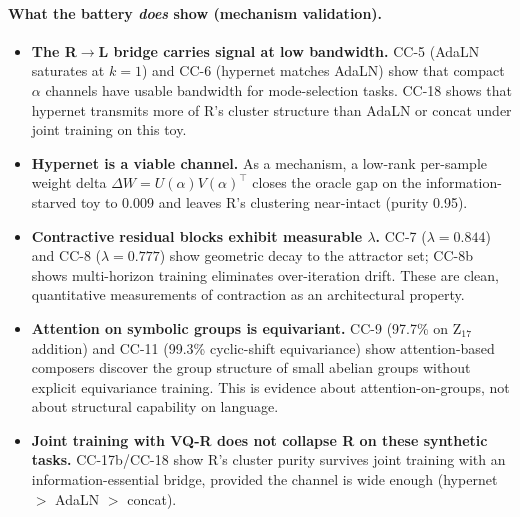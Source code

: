 \documentclass[10pt, twocolumn, a4paper]{article}
\begin{document}
\paragraph{What the battery \emph{does} show (mechanism validation).}
\begin{itemize}[nosep,leftmargin=*]
\item \textbf{The R$\to$L bridge carries signal at low bandwidth.} CC-5 (AdaLN saturates at $k{=}1$) and CC-6 (hypernet matches AdaLN) show that compact $\alpha$ channels have usable bandwidth for mode-selection tasks. CC-18 shows that hypernet transmits more of R's cluster structure than AdaLN or concat under joint training on this toy.
\item \textbf{Hypernet is a viable channel.} As a mechanism, a low-rank per-sample weight delta $\Delta W = U(\alpha) V(\alpha)^\top$ closes the oracle gap on the information-starved toy to 0.009 and leaves R's clustering near-intact (purity 0.95).
\item \textbf{Contractive residual blocks exhibit measurable $\lambda$.} CC-7 ($\lambda = 0.844$) and CC-8 ($\lambda = 0.777$) show geometric decay to the attractor set; CC-8b shows multi-horizon training eliminates over-iteration drift. These are clean, quantitative measurements of contraction as an architectural property.
\item \textbf{Attention on symbolic groups is equivariant.} CC-9 (97.7\% on Z$_{17}$ addition) and CC-11 (99.3\% cyclic-shift equivariance) show attention-based composers discover the group structure of small abelian groups without explicit equivariance training. This is evidence about attention-on-groups, not about structural capability on language.
\item \textbf{Joint training with VQ-R does not collapse R on these synthetic tasks.} CC-17b/CC-18 show R's cluster purity survives joint training with an information-essential bridge, provided the channel is wide enough (hypernet $>$ AdaLN $>$ concat).
\end{itemize}
\end{document}
